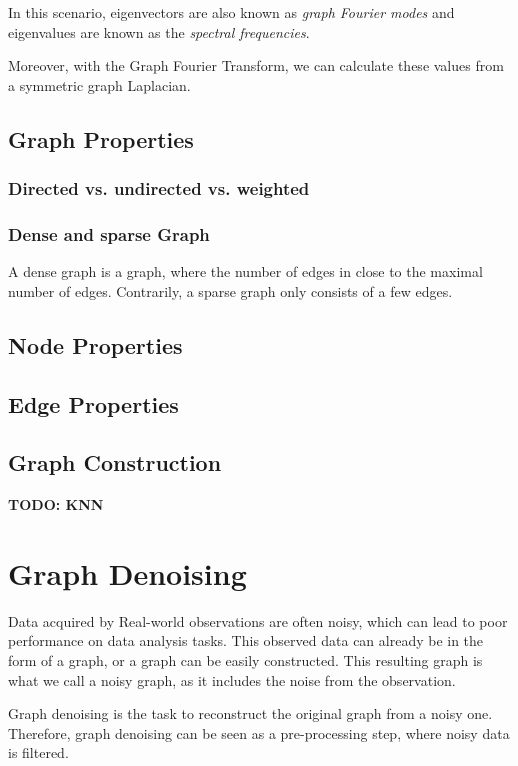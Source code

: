 In this scenario, eigenvectors are also known as \textit{graph Fourier modes}
and eigenvalues are known as the \textit{spectral frequencies}.

Moreover, with the Graph Fourier Transform, we can calculate these values from a symmetric
graph Laplacian.

\subsection{Graph Properties}

\subsubsection{Directed vs. undirected vs. weighted}

\subsubsection{Dense and sparse Graph}
A dense graph is a graph, where the number of edges in close to the maximal number of edges.
Contrarily, a sparse graph only consists of a few edges.

\subsection{Node Properties}
\subsection{Edge Properties}

\subsection{Graph Construction}
\textbf{TODO: KNN}



\section{Graph Denoising}
Data acquired by Real-world observations are often noisy, which can lead to poor 
performance on data analysis tasks. This observed data can already be in the form of a graph,
or a graph can be easily constructed. This resulting graph is what we call
a noisy graph, as it includes the noise from the observation.

Graph denoising is the task to reconstruct the original graph from a noisy one.
Therefore, graph denoising can be seen as a pre-processing step, where noisy data is filtered.

